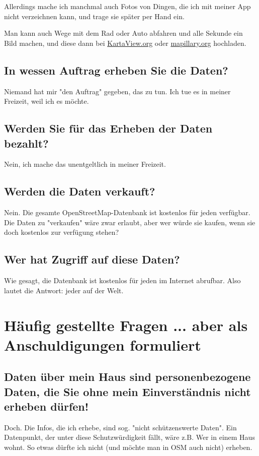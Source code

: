 \documentclass[10pt,foldmark,notumble]{leaflet}
\newcommand{\myhy}[1]{{\color{blue}\setulcolor{blue}\ul{#1}}}
\begin{document}
    Allerdings mache ich manchmal auch Fotos von Dingen, die ich mit meiner App nicht verzeichnen kann, und trage sie später per Hand ein.

    Man kann auch Wege mit dem Rad oder Auto abfahren und alle Sekunde ein Bild machen, und diese dann bei \myhy{KartaView.org} oder \myhy{mapillary.org} hochladen.

    \subsection{In wessen Auftrag erheben Sie die Daten?}
    Niemand hat mir "den Auftrag" gegeben, das zu tun.
    Ich tue es in meiner Freizeit, weil ich es möchte.

    \subsection{Werden Sie für das Erheben der Daten bezahlt?}
    Nein, ich mache das unentgeltlich in meiner Freizeit.

    \subsection{Werden die Daten verkauft?}
    Nein.
    Die gesamte OpenStreetMap-Datenbank ist kostenlos für jeden verfügbar.
    Die Daten zu "verkaufen" wäre zwar erlaubt, aber wer würde sie kaufen, wenn sie doch kostenlos zur verfügung stehen?

    \subsection{Wer hat Zugriff auf diese Daten?}
    Wie gesagt, die Datenbank ist kostenlos für jeden im Internet abrufbar.
    Also lautet die Antwort: jeder auf der Welt.


    \section{Häufig gestellte Fragen {\small ... aber als Anschuldigungen formuliert}}
    \subsection{Daten über mein Haus sind personenbezogene Daten, die Sie ohne mein Einverständnis nicht erheben dürfen!}
    Doch.
    Die Infos, die ich erhebe, sind sog. "nicht schützenswerte Daten".
    Ein Datenpunkt, der unter diese Schutzwürdigkeit fällt, wäre z.B. Wer in einem Haus wohnt.
    So etwas dürfte ich nicht (und möchte man in OSM auch nicht) erheben.
\end{document}
